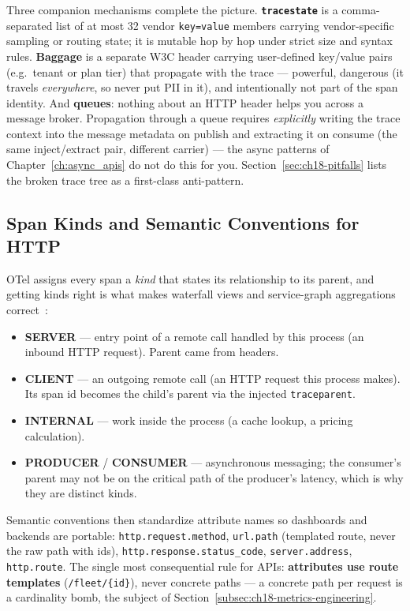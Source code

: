 Three companion mechanisms complete the picture. \textbf{\texttt{tracestate}}
is a comma-separated list of at most 32 vendor \texttt{key=value} members
carrying vendor-specific sampling or routing state; it is mutable hop by
hop under strict size and syntax rules. \textbf{Baggage} is a separate W3C
header carrying user-defined key/value pairs (e.g.\ tenant or plan tier)
that propagate with the trace --- powerful, dangerous (it travels
\emph{everywhere}, so never put PII in it), and intentionally not part of
the span identity. And \textbf{queues}: nothing about an HTTP header helps
you across a message broker. Propagation through a queue requires
\emph{explicitly} writing the trace context into the message metadata on
publish and extracting it on consume (the same inject/extract pair,
different carrier) --- the async patterns of Chapter~\ref{ch:async_apis}
do not do this for you. Section~\ref{sec:ch18-pitfalls} lists the broken
trace tree as a first-class anti-pattern.

\subsection{Span Kinds and Semantic Conventions for HTTP}
\label{subsec:ch18-semconv}

OTel assigns every span a \emph{kind} that states its relationship to its
parent, and getting kinds right is what makes waterfall views and
service-graph aggregations correct~\cite{opentelemetrydocs}:

\begin{itemize}
  \item \textbf{SERVER} --- entry point of a remote call handled by this
        process (an inbound HTTP request). Parent came from headers.
  \item \textbf{CLIENT} --- an outgoing remote call (an HTTP request this
        process makes). Its span id becomes the child's parent via the
        injected \texttt{traceparent}.
  \item \textbf{INTERNAL} --- work inside the process (a cache lookup, a
        pricing calculation).
  \item \textbf{PRODUCER} / \textbf{CONSUMER} --- asynchronous messaging;
        the consumer's parent may not be on the critical path of the
        producer's latency, which is why they are distinct kinds.
\end{itemize}

Semantic conventions then standardize attribute names so dashboards and
backends are portable: \texttt{http.request.method},
\texttt{url.path} (templated route, never the raw path with ids),
\texttt{http.response.status\_code}, \texttt{server.address},
\texttt{http.route}. The single most consequential rule for APIs:
\textbf{attributes use route templates} (\texttt{/fleet/\{id\}}), never
concrete paths --- a concrete path per request is a cardinality bomb, the
subject of Section~\ref{subsec:ch18-metrics-engineering}.

